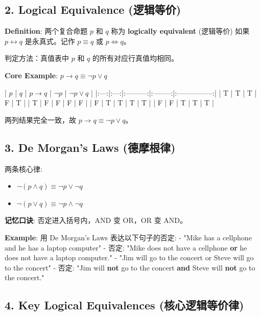 \documentclass[10pt,a4paper,openany]{ctexbook}
\theoremstyle{definition}
\theoremstyle{remark}
\renewenvironment{quote}
  {\list{}{\leftmargin=1em\rightmargin=0pt\topsep=0.5pt\partopsep=0pt}\item[]}
  {\endlist}
\begin{document}
\subsection{2. Logical Equivalence (逻辑等价)}

\textbf{Definition}: 两个复合命题 $p$ 和 $q$ 称为 \textbf{logically equivalent} (逻辑等价) 如果 $p \leftrightarrow q$ 是永真式。记作 $p \equiv q$ 或 $p \Leftrightarrow q$。
\begin{quote}
判定方法：真值表中 $p$ 和 $q$ 的所有对应行真值均相同。

\textbf{Core Example}: $p \to q \equiv \neg p \lor q$

| $p$ | $q$ | $p \to q$ | $\neg p$ | $\neg p \lor q$ |
|:---:|:---:|:---------:|:--------:|:---------------:|
| T | T | T | F | T |
| T | F | F | F | F |
| F | T | T | T | T |
| F | F | T | T | T |

两列结果完全一致，故 $p \to q \equiv \neg p \lor q$。

\end{quote}
\vspace{-2pt}

\subsection{3. De Morgan's Laws (德摩根律)}

两条核心律:
\begin{itemize}
\item $\neg(p \land q) \equiv \neg p \lor \neg q$
\item $\neg(p \lor q) \equiv \neg p \land \neg q$

\end{itemize}

\begin{quote}
\textbf{记忆口诀}: 否定进入括号内，AND 变 OR，OR 变 AND。

\textbf{Example}: 用 De Morgan's Laws 表达以下句子的否定:
- "Mike has a cellphone and he has a laptop computer"
- 否定: "Mike does not have a cellphone \textbf{or} he does not have a laptop computer."
- "Jim will go to the concert or Steve will go to the concert"
- 否定: "Jim will \textbf{not} go to the concert \textbf{and} Steve will \textbf{not} go to the concert."

\end{quote}
\vspace{-2pt}

\subsection{4. Key Logical Equivalences (核心逻辑等价律)}
\end{document}
